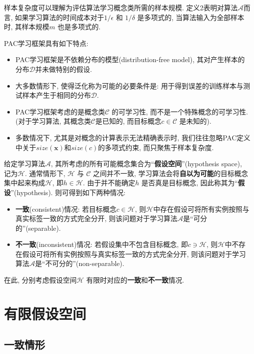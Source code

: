 样本复杂度可以理解为评估算法学习概念类所需的样本规模. 定义2表明对算法$\mathcal{A}$而言, 如果学习算法的时间成本对于${1}/{\epsilon}$ 和 ${1}/{\delta} $ 是多项式的, 当算法输入为全部样本时, 其样本规模$m$ 也是多项式的.

PAC学习框架具有如下特点:
\begin{itemize}
  \item PAC学习框架是不依赖分布的模型(distribution-free model), 其对产生样本的分布$\mathcal{D}$并未做特别的假设.
  \item 大多数情形下, 使得泛化称为可能的必要条件是: 用于得到误差的训练样本与测试样本产生于相同的分布$\mathcal{D}$.
  \item PAC学习框架考虑的是概念类$\mathcal{C}$ 的可学习性, 而不是一个特殊概念的可学习性. (对于学习算法, 其概念类$\mathcal{C}$是已知的, 而目标概念$c \in \mathcal{C}$ 是未知的).
  \item 多数情况下, 尤其是对概念的计算表示无法精确表示时, 我们往往忽略PAC定义中关于$size(\mathbf{x})$和$size(c)$的多项式约束, 而只聚焦于样本复杂度.
\end{itemize}
\par
给定学习算法$\mathcal{A}$, 其所考虑的所有可能概念集合为“\textbf{假设空间}”(hypothesis space), 记为$\mathcal{H}$. 通常情形下, $\mathcal{H}$ 与 $\mathcal{C}$ 之间并不一致, 学习算法会将\textbf{自以为可能}的目标概念集中起来构成$\mathcal{H}$, 即$h\in\mathcal{H}$. 由于并不能确定$h$ 是否真是目标概念, 因此称其为“\textbf{假设}”(hypothesis). 则可得到如下两种情况:
\par
\begin{itemize}
  \item \textbf{一致}(consistent)情况: 若目标概念$c\in \mathcal{H}$, 则$\mathcal{H}$中存在假设可将所有实例按照与真实标签一致的方式完全分开, 则该问题对于学习算法$\mathcal{A}$是“可分的”(separable).
  \item \textbf{不一致}(inconsistent)情况: 若假设集中不包含目标概念, 即$c\ni \mathcal{H}$, 则$\mathcal{H}$中不存在假设可将所有实例按照与真实标签一致的方式完全分开, 则该问题对于学习算法$\mathcal{A}$是“不可分的”(non-separable).
\end{itemize}
\par
在此, 分别考虑假设空间$\mathcal{H}$ 有限时对应的\textbf{一致}和\textbf{不一致}情况.
\section{有限假设空间}
\subsection{一致情形}

